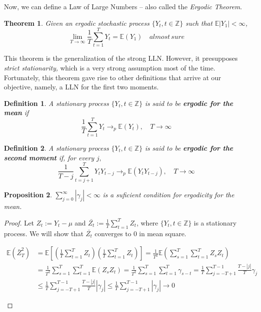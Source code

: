 \documentclass[11pt, a4paper]{report}
\theoremstyle{plain}
\newtheorem{thm}{Theorem}[section]
\newtheorem{prop}[thm]{Proposition}
\theoremstyle{plain}
\newtheorem{defn}{Definition}[section]
\theoremstyle{remark}
\begin{document}
Now, we can define a Law of Large Numbers -- also called the \textit{Ergodic Theorem}.

\begin{thm}
	Given an ergodic stochastic process $\{Y_t, t \in \mathbb{Z} \}$ such that $\mathbb{E}|Y_1| < \infty$,
	$$\lim_{T \rightarrow \infty} \dfrac{1}{T} \sum_{t=1}^T Y_t = \mathbb{E}(Y_1) \hspace{1em} almost \, sure$$
\end{thm}

This theorem is the generalization of the strong LLN. However, it presupposes \textit{strict stationarity,} which is a very strong assumption most of the time. Fortunately, this theorem gave rise to other definitions that arrive at our objective, namely, a LLN for the first two moments.

\begin{defn}
	A stationary process $\{Y_t, t \in \mathbb{Z} \}$ is said to be \textbf{ergodic for the mean} if
	$$ \dfrac{1}{T} \sum_{t=1}^T Y_t \to_p \mathbb{E}(Y_t), \hspace{1em} T \to \infty $$
\end{defn}

\begin{defn}
	A stationary process $\{Y_t, t \in \mathbb{Z} \}$ is said to be \textbf{ergodic for the second moment} if, for every $j,$
	$$ \dfrac{1}{T-j} \sum_{t=j+1}^T Y_t Y_{t-j} \to_p \mathbb{E}(Y_t Y_{t-j}), \hspace{1em} T \to \infty $$
\end{defn}

\begin{prop} \label{sum-ergodicity}
	$\sum_{j=0}^{\infty} |\gamma_j| < \infty $ is a suficient condition for ergodicity for the mean.
\end{prop}

\begin{proof}
	Let $Z_t := Y_t - \mu$ and $\bar{Z_t} := \frac{1}{T} \sum_{t=1}^T Z_t$, where $\{Y_t, t \in \mathbb{Z} \}$ is a stationary process. We will show that $\bar{Z_t}$ converges to 0 in mean square.
	\begin{center}


	\begin{math}
		\begin{aligned}
			\mathbb{E}\left(\bar{Z}_{T}^{2}\right) &=\mathbb{E}\left[\left(\frac{1}{T} \sum_{t=1}^{T} Z_{t}\right)\left(\frac{1}{T} \sum_{t=1}^{T} Z_{t}\right)\right]=\frac{1}{T^{2}} \mathbb{E}\left(\sum_{s=1}^{T} \sum_{t=1}^{T} Z_{s} Z_{t}\right) \\
			&=\frac{1}{T^{2}} \sum_{s=1}^{T} \sum_{t=1}^{T} \mathbb{E}\left(Z_{s} Z_{t}\right)=\frac{1}{T^{2}} \sum_{s=1}^{T} \sum_{t=1}^{T} \gamma_{s-t}=\frac{1}{T} \sum_{j=-T+1}^{T-1} \frac{T-|j|}{T} \gamma_{j} \\
			& \leq \frac{1}{T} \sum_{j=-T+1}^{T-1} \frac{T-|j|}{T}\left|\gamma_{j}\right| \leq \frac{1}{T} \sum_{j=-T+1}^{T-1}\left|\gamma_{j}\right| \rightarrow 0
		\end{aligned}
	\end{math} 
\end{center}
\end{proof}
\end{document}
